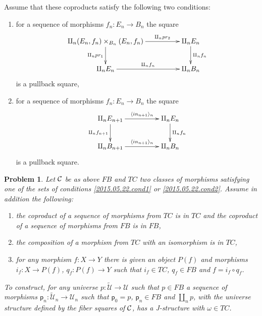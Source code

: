 \documentclass[12pt]{article}
\numberwithin{equation}{section}
\newtheorem{problem}[proposition]{Problem}
\newcommand{\llabel}[1]{\label{#1}}
\newcommand{\sr}{\rightarrow}
\newcommand{\wt}{\widetilde}
\newcommand{\p}{\mathsf{p}}
\newcommand{\U}{\mathcal{U}}
\begin{document}
Assume that these coproducts satisfy the following two conditions:
%
\begin{enumerate}
\item for a sequence of morphisms $f_n:E_n\sr B_n$ the square
%
$$
\begin{xy}
          \xymatrix@C=4pc{ \amalg_n (E_n,f_n)\times_{B_n}(E_n,f_n)
            \ar[r]^-{\amalg_n pr_2} \ar[d]_{\amalg_n pr_1} & \amalg_n E_n
            \ar[d]^{\amalg_n f_n}\\ \amalg_n E_n \ar[r]^-{\amalg_n f_n} &
            \amalg_n B_n }
\end{xy}
$$
%
is a pullback square,
%
\item for a sequence of morphisms $f_n:E_n\sr B_n$ the square
%
$$
\begin{xy}
          \xymatrix@C=4pc{ \amalg_n E_{n+1} \ar[r]^-{\langle in_{n+1}
              \rangle_{n}} \ar[d]_{\amalg_n f_{n+1}} & \amalg_n E_n
            \ar[d]^{\amalg_n f_n}\\ \amalg_n B_{n+1} \ar[r]^-{\langle in_{n+1}
              \rangle_{n}} & \amalg_n B_n }
\end{xy}
$$
%
is a pullback square.
\end{enumerate}
%
%
\begin{problem}
\llabel{2015.05.22.th2} Let $\cal C$ be as above $FB$ and $TC$ two classes of
morphisms satisfying one of the sets of conditions \ref{2015.05.22.cond1} or
\ref{2015.05.22.cond2}. Assume in addition the following:
%
\begin{enumerate}
\item the coproduct of a sequence of morphisms from $TC$ is in $TC$ and the
  coproduct of a sequence of morphisms from $FB$ is in $FB$,
\item the composition of a morphism from $TC$ with an isomorphism is in $TC$,
\item for any morphism $f: X \sr Y$ there is given an object $P(f)$ and
  morphisms $i_f:X\sr P(f)$, $q_f:P(f)\sr Y$ such that $i_f\in TC$, $q_f\in FB$
  and $f=i_f\circ q_f$.
\end{enumerate}
%
To construct, for any universe $p: \wt{\U}\sr \U$ such that $p\in FB$ a sequence
of morphisms $\p_n:\wt{\U}_n\sr \U_n$ such that $\p_0=p$, $\p_n\in FB$ and $\amalg_n
p$, with the universe structure defined by the fiber squares of $\cal C$, has a
J-structure with $\omega\in TC$.
\end{problem}
%
\end{document}

